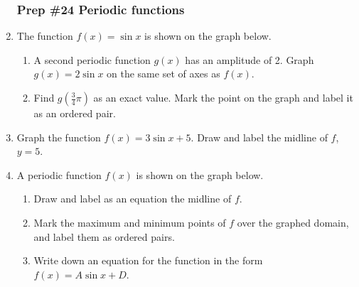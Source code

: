 \documentclass[12pt, twoside]{article}
\begin{document}
\begin{enumerate}[itemsep=0.5cm]
\subsubsection*{Prep \#24 Periodic functions}
\item The function $f(x)= \sin x$ is shown on the graph below. 
\begin{center}
    \end{center}
    \begin{enumerate}
        \item A second periodic function $g(x)$ has an amplitude of 2. Graph $g(x)=2\sin x$ on the same set of axes as $f(x)$.
        \item Find $g(\frac{3}{4}\pi)$ as an exact value. Mark the point on the graph and label it as an ordered pair.
    \end{enumerate}

\item Graph the function $f(x)= 3 \sin x +5$. Draw and label the midline of $f$, $y=5$.
\begin{center}
    \end{center}

\newpage
\item A periodic function $f(x)$ is shown on the graph below.
\begin{enumerate}
    \item Draw and label as an equation the midline of $f$.
    \item Mark the maximum and minimum points of $f$ over the graphed domain, and label them as ordered pairs.
    \item Write down an equation for the function in the form $f(x)=A \sin x+D$. \vspace{2cm}


\end{enumerate}
\end{enumerate}
\end{document}
